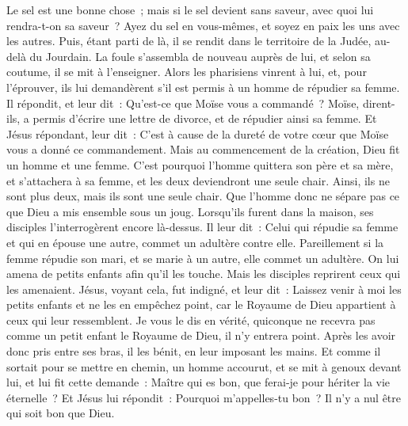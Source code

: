 \begin{multicols}{2}
Le sel est une bonne chose~; mais si le sel devient sans saveur, avec quoi lui rendra-t-on sa saveur~?
Ayez du sel en vous-mêmes, et soyez en paix les uns avec les autres.
\VerseOne{}Puis, étant parti de là, il se rendit dans le territoire de la Judée, au-delà du Jourdain. La foule s'assembla de nouveau auprès de lui, et selon sa coutume, il se mit à l'enseigner.
Alors les pharisiens vinrent à lui, et, pour l'éprouver, ils lui demandèrent s'il est permis à un homme de répudier sa femme.
Il répondit, et leur dit~: Qu'est-ce que Moïse vous a commandé~?
Moïse, dirent-ils, a permis d'écrire une lettre de divorce, et de répudier ainsi sa femme.
Et Jésus répondant, leur dit~: C'est à cause de la dureté de votre cœur que Moïse vous a donné ce commandement.
Mais au commencement de la création, Dieu fit un homme et une femme.
C'est pourquoi l'homme quittera son père et sa mère, et s'attachera à sa femme,
et les deux deviendront une seule chair. Ainsi, ils ne sont plus deux, mais ils sont une seule chair.
Que l'homme donc ne sépare pas ce que Dieu a mis ensemble sous un joug.
Lorsqu'ils furent dans la maison, ses disciples l'interrogèrent encore là-dessus.
Il leur dit~: Celui qui répudie sa femme et qui en épouse une autre, commet un adultère contre elle.
Pareillement si la femme répudie son mari, et se marie à un autre, elle commet un adultère.
On lui amena de petits enfants afin qu'il les touche. Mais les disciples reprirent ceux qui les amenaient.
Jésus, voyant cela, fut indigné, et leur dit~: Laissez venir à moi les petits enfants et ne les en empêchez point, car le Royaume de Dieu appartient à ceux qui leur ressemblent.
Je vous le dis en vérité, quiconque ne recevra pas comme un petit enfant le Royaume de Dieu, il n'y entrera point.
Après les avoir donc pris entre ses bras, il les bénit, en leur imposant les mains.
Et comme il sortait pour se mettre en chemin, un homme accourut, et se mit à genoux devant lui, et lui fit cette demande~: Maître qui es bon, que ferai-je pour hériter la vie éternelle~?
Et Jésus lui répondit~: Pourquoi m'appelles-tu bon~? Il n'y a nul être qui soit bon que Dieu.

\end{multicols}
